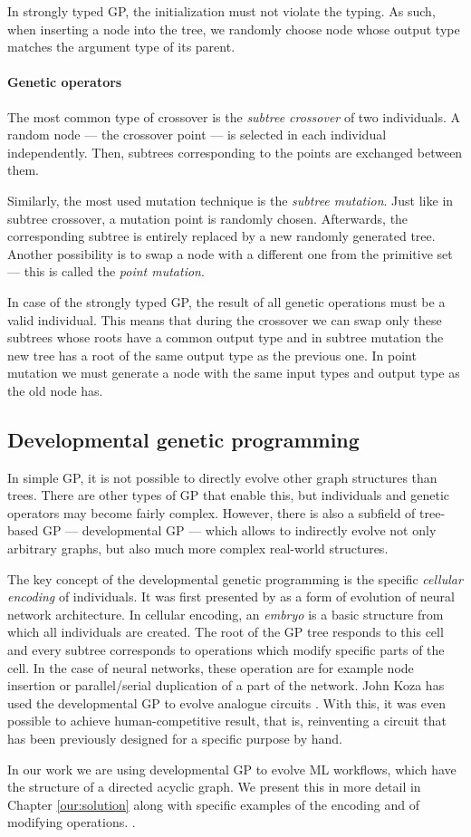 In strongly typed GP, the initialization must not violate the typing. As such,
when inserting a node into the tree, we randomly choose node whose output type
matches the argument type of its parent.

\paragraph{Genetic operators} \label{treeops}
The most common type of crossover is the \emph{subtree crossover} of two
individuals. A random node --- the crossover point ---
is selected in each individual independently. Then, subtrees corresponding
to the points are exchanged between them.

Similarly, the most used mutation technique is the \emph{subtree mutation}.
Just like in subtree crossover, a mutation point is randomly chosen.
Afterwards, the corresponding subtree is entirely replaced by a new randomly
generated tree. Another possibility is to swap a node with a different one
from the primitive set --- this is called the \emph{point mutation}.

In case of the strongly typed GP, the result of all genetic operations must
be a valid individual. This means that during the crossover we can swap only
these subtrees whose roots have a common output type and in subtree mutation
the new tree has a root of the same output type as the previous one. In point
mutation we must generate a node with the same input types and output type as
the old node has.
\citep{Poli:2008:FGG:1796422}

\subsection{Developmental genetic programming} \label{devGP}
In simple GP, it is not possible to directly evolve other graph structures
than trees. There are other types of GP that enable this, but individuals
and genetic operators may become fairly complex. However, there is also a
subfield of tree-based GP --- developmental GP --- which allows to indirectly
evolve not only arbitrary graphs, but also much more complex real-world
structures.

The key concept of the developmental genetic programming is the
specific \emph{cellular encoding} of individuals. It was first presented by
\cite{Gruau:1994:thesis} as a form of evolution of neural network architecture.
In cellular encoding, an \emph{embryo} is a basic structure from which all
individuals are created.
The root of the GP tree responds to this cell and every subtree corresponds
to operations which modify specific parts of the cell. In the case of neural
networks, these operation are for example node insertion or parallel/serial
duplication of a part of the network. John Koza has used the developmental GP
to evolve analogue circuits \citep{Koza:1998:circuits}. With this, it was even
possible to achieve human-competitive result, that is, reinventing a circuit
that has been previously designed for a specific purpose by hand.

In our work we are using developmental GP to evolve ML workflows, which have
the structure of a directed acyclic graph. We present this in more detail in
Chapter \ref{our:solution} along with specific examples of the encoding and
of modifying operations.
.